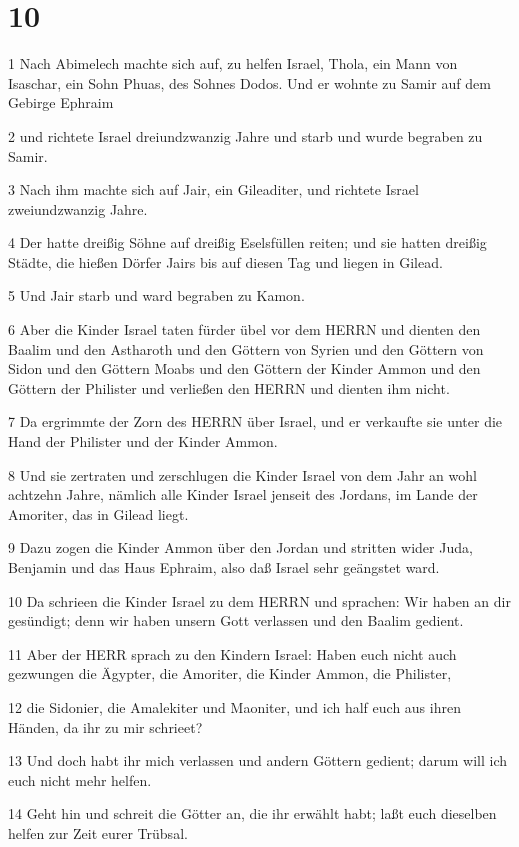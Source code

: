 \chapter{10}

\par 1 Nach Abimelech machte sich auf, zu helfen Israel, Thola, ein Mann von Isaschar, ein Sohn Phuas, des Sohnes Dodos. Und er wohnte zu Samir auf dem Gebirge Ephraim
\par 2 und richtete Israel dreiundzwanzig Jahre und starb und wurde begraben zu Samir.
\par 3 Nach ihm machte sich auf Jair, ein Gileaditer, und richtete Israel zweiundzwanzig Jahre.
\par 4 Der hatte dreißig Söhne auf dreißig Eselsfüllen reiten; und sie hatten dreißig Städte, die hießen Dörfer Jairs bis auf diesen Tag und liegen in Gilead.
\par 5 Und Jair starb und ward begraben zu Kamon.
\par 6 Aber die Kinder Israel taten fürder übel vor dem HERRN und dienten den Baalim und den Astharoth und den Göttern von Syrien und den Göttern von Sidon und den Göttern Moabs und den Göttern der Kinder Ammon und den Göttern der Philister und verließen den HERRN und dienten ihm nicht.
\par 7 Da ergrimmte der Zorn des HERRN über Israel, und er verkaufte sie unter die Hand der Philister und der Kinder Ammon.
\par 8 Und sie zertraten und zerschlugen die Kinder Israel von dem Jahr an wohl achtzehn Jahre, nämlich alle Kinder Israel jenseit des Jordans, im Lande der Amoriter, das in Gilead liegt.
\par 9 Dazu zogen die Kinder Ammon über den Jordan und stritten wider Juda, Benjamin und das Haus Ephraim, also daß Israel sehr geängstet ward.
\par 10 Da schrieen die Kinder Israel zu dem HERRN und sprachen: Wir haben an dir gesündigt; denn wir haben unsern Gott verlassen und den Baalim gedient.
\par 11 Aber der HERR sprach zu den Kindern Israel: Haben euch nicht auch gezwungen die Ägypter, die Amoriter, die Kinder Ammon, die Philister,
\par 12 die Sidonier, die Amalekiter und Maoniter, und ich half euch aus ihren Händen, da ihr zu mir schrieet?
\par 13 Und doch habt ihr mich verlassen und andern Göttern gedient; darum will ich euch nicht mehr helfen.
\par 14 Geht hin und schreit die Götter an, die ihr erwählt habt; laßt euch dieselben helfen zur Zeit eurer Trübsal.
